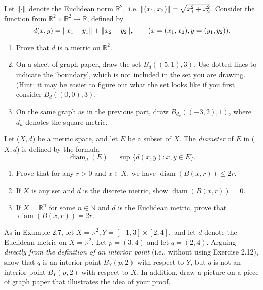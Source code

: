 \documentclass[12pt,letterpaper,boxed]{hmcpset}
\DeclarePairedDelimiter{\norm}{\lVert}{\rVert}
\DeclareMathOperator{\diam}{diam}
\begin{document}
\begin{problem}[Exercise 2.6.]
Let $\norm{\cdot}$ denote the Euclidean norm $\mathbb{R}^{2},$ i.e. $\norm{(x_1, x_2)} = \sqrt{x_1^{2} + x_2^{2}}.$ Consider the function from $\mathbb{R}^{2} \times \mathbb{R}^{2} \rightarrow \mathbb{R}$, defined by $$d(x, y) = \norm{x_1 - y_1} + \norm{x_2 - y_2}, \quad \quad (x = (x_1, x_2), y = (y_1, y_2)). $$
\vspace{-2mm}
\begin{enumerate}
	\itemsep0em
	\item Prove that $d$ is a metric on $\mathbb{R}^{2}.$
	\item On a sheet of graph paper, draw the set $B_{d}((5, 1), 3).$ Use dotted lines to indicate the ‘boundary’,
which is not included in the set you are drawing. (Hint: it may be easier to figure out what the
set looks like if you first consider $B_{d}((0, 0), 3).$
	\item On the same graph as in the previous part, draw $B_{d_{u}}((-3, 2),1)$, where $d_{u}$ denotes the square metric.
\end{enumerate}
\end{problem}
\begin{solution}

\end{solution}

\begin{problem}[Exercise 2.8.]
Let ($X, d$) be a metric space, and let $E$ be a subset of $X$. The \textit{diameter} of $E$ in ($X,d$) is defined by the formula $$\diam_{d}(E) = \sup\{d(x,y) : x,y \in E\}.$$

\vspace{-2mm}
\begin{enumerate}
	\itemsep0em
	\item Prove that for any $r > 0$ and $x \in X$, we have $\diam(B(x,r))\leq 2r.$
	\item If $X$ is any set and $d$ is the discrete metric, show $\diam(B(x, r)) = 0.$
	\item If $X = \mathbb{R}^{n}$ for some $n \in \mathbb{N}$ and $d$ is the Euclidean metric, prove that $\diam(B(x,r)) = 2r.$ 
\end{enumerate}

\end{problem}
\begin{solution}

\end{solution}

\begin{problem}[Exercise 2.11.]
As in Example 2.7, let $X = \mathbb{R}^{2}, Y = [-1,3]\times[2,4],$ and let $d$ denote the Euclidean metric on $X = \mathbb{R}^{2}.$ Let $p = (3,4)$ and let $q = (2, 4)$. Arguing \textit{directly from the definition of an interior point} (i.e., without using Exercise 2.12), show that $q$ is an interior point $B_{Y}(p,2)$ with respect to $Y$, but $q$ is not an interior point $B_{Y}(p,2)$ with respect to $X$. In addition, draw a picture on a piece of graph paper that illustrates the idea of your proof.
\end{problem}
\begin{solution}

\end{solution}
\end{document}
